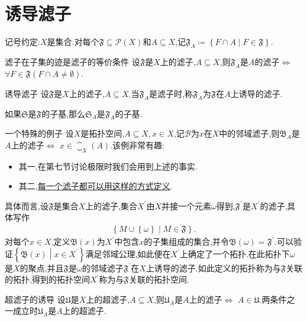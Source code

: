 \section{诱导滤子}

记号约定:$X$是集合.对每个$\mathfrak{F}\subseteq\mathcal{P}\left(X\right)$和$A\subseteq X$,记$\mathfrak{F}_{A}\coloneq\left\{F\cap A\middle|F\in\mathfrak{F}\right\}$.

\begin{proposition}{滤子在子集的迹是滤子的等价条件}{}
	设$\mathfrak{F}$是$X$上的滤子,$A\subseteq X$,则$\mathfrak{F}_{A}$是$A$的滤子$\iff$ $\forall F\in\mathfrak{F}\left(F\cap A\neq\emptyset\right)$.
\end{proposition}

\begin{definition}{诱导滤子}{}
	设$\mathfrak{F}$是$X$上的滤子,$A\subseteq X$.当$\mathfrak{F}_{A}$是滤子时,称$\mathfrak{F}_{A}$为$\mathfrak{F}$在$A$上诱导的滤子.
\end{definition}

\begin{remark}{}{}
	如果$\mathfrak{S}$是$\mathfrak{F}$的子基,那么$\mathfrak{S}_{A}$是$\mathfrak{F}_{A}$的子基.
\end{remark}

\begin{example}{一个特殊的例子}{}
	设$X$是拓扑空间,$A\subseteq X,x\in X$,记$\mathcal{B}$为$x$在$X$中的邻域滤子,则$\mathfrak{B}_{A}$是$A$上的滤子$\iff$ $x\in\closure_{X}\left(A\right)$.该例非常有趣:
	\begin{itemize}
		\item 其一,在第七节讨论极限时我们会用到上述的事实.
		\item 其二,\underline{每一个滤子都可以用这样的方式定义}.
	\end{itemize}
	具体而言,设$\mathfrak{F}$是集合$X$上的滤子,集合$X^{\prime}$由$X$并接一个元素$\omega$得到,$\mathfrak{F}^{\prime}$是$X^{\prime}$的滤子,具体写作
	\begin{align*}
		\left\{M\cup\left\{\omega\right\}\middle|M\in\mathfrak{F}\right\}.
	\end{align*}
	对每个$x\in X$,定义$\mathfrak{B}\left(x\right)$为$X^{\prime}$中包含$x$的子集组成的集合,并令$\mathfrak{B}\left(\omega\right)=\mathfrak{F}^{\prime}$.可以验证$\left\{\mathfrak{B}\left(x\right)\middle|x\in X^{\prime}\right\}$满足邻域公理,如此便在$X^{\prime}$上确定了一个拓扑.在此拓扑下$\omega$是$X$的聚点,并且$\mathfrak{F}$是$\omega$的邻域滤子$\mathfrak{F}^{\prime}$在$X$上诱导的滤子.如此定义的拓扑称为与$\mathfrak{F}$关联的拓扑,得到的拓扑空间$X^{\prime}$称为与$\mathfrak{F}$关联的拓扑空间.
\end{example}

\begin{proposition}{超滤子的诱导}{}
	设$\mathfrak{U}$是$X$上的超滤子,$A\subseteq X$,则$\mathfrak{U}_{A}$是$A$上的滤子$\iff$ $A\in\mathfrak{U}$.两条件之一成立时$\mathfrak{U}_{A}$是$A$上的超滤子.
\end{proposition}